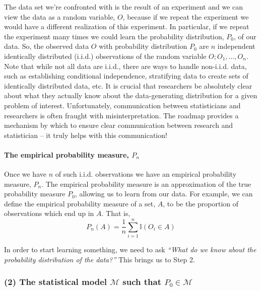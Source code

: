 \documentclass[12pt, krantz2,]{krantz}
\let\oldparagraph\paragraph
\renewcommand{\paragraph}[1]{\oldparagraph{#1}\mbox{}}
\theoremstyle{definition}
\theoremstyle{definition}
\theoremstyle{definition}
\newcommand{\M}{\mathcal{M}}
\newcommand{\I}{\mathbb{I}}
\newcommand{\1}{\mathbbm{1}}
\begin{document}
The data set we're confronted with is the result of an experiment and we can
view the data as a random variable, \(O\), because if we repeat the experiment
we would have a different realization of this experiment. In particular, if we
repeat the experiment many times we could learn the probability distribution,
\(P_0\), of our data. So, the observed data \(O\) with probability distribution
\(P_0\) are \(n\) independent identically distributed (i.i.d.) observations of the
random variable \(O; O_1, \ldots, O_n\). Note that while not all data are i.i.d.,
there are ways to handle non-i.i.d. data, such as establishing conditional
independence, stratifying data to create sets of identically distributed data,
etc. It is crucial that researchers be absolutely clear about what they actually
know about the data-generating distribution for a given problem of interest.
Unfortunately, communication between statisticians and researchers is often
fraught with misinterpretation. The roadmap provides a mechanism by which to
ensure clear communication between research and statistician -- it truly helps
with this communication!

\hypertarget{the-empirical-probability-measure-p_n}{%
\paragraph{\texorpdfstring{The empirical probability measure, \(P_n\)}{The empirical probability measure, P\_n}}\label{the-empirical-probability-measure-p_n}}

Once we have \(n\) of such i.i.d. observations we have an empirical probability
measure, \(P_n\). The empirical probability measure is an approximation of the
true probability measure \(P_0\), allowing us to learn from our data. For
example, we can define the empirical probability measure of a set, \(A\), to be
the proportion of observations which end up in \(A\). That is,
\begin{equation*}
  P_n(A) = \frac{1}{n}\sum_{i=1}^{n} \I(O_i \in A)
\end{equation*}

In order to start learning something, we need to ask \emph{``What do we know about the
probability distribution of the data?''} This brings us to Step 2.

\hypertarget{the-statistical-model-m-such-that-p_0-in-m}{%
\subsubsection*{\texorpdfstring{(2) The statistical model \(\M\) such that \(P_0 \in \M\)}{(2) The statistical model \textbackslash{}M such that P\_0 \textbackslash{}in \textbackslash{}M}}\label{the-statistical-model-m-such-that-p_0-in-m}}
\end{document}
